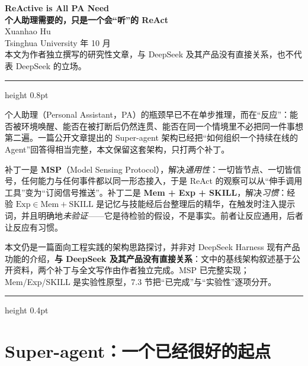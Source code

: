 \documentclass[11pt,a4paper,UTF8,fontset=windows]{ctexart}
\begin{document}
\thispagestyle{first}

\begin{center}
  {\LARGE\sffamily\bfseries ReActive is All PA Need}\\[0.5em]
  {\large\sffamily\bfseries 个人助理需要的，只是一个会“听”的 ReAct}\\[1.1em]
  {\normalsize Xuanhao Hu}\\[0.3em]
  {\footnotesize\color{dagray}Tsinghua University  年 10 月}\\[0.7em]
  {\footnotesize\color{dagray}本文为作者独立撰写的研究性文章，与 DeepSeek 及其产品没有直接关系，也不代表 DeepSeek 的立场。}
\end{center}
\vspace{0.6em}
{\color{dsblue}\hrule height 0.8pt}
\vspace{1.0em}

\noindent
{\small
\setlength{\parindent}{0pt}%
个人助理（Personal Assistant，PA）的瓶颈早已不在单步推理，而在“反应”：能否被环境唤醒、能否在被打断后仍然连贯、能否在同一个情境里不必把同一件事想第二遍。一篇公开文章提出的 Super-agent 架构已经把“如何组织一个持续在线的 Agent”回答得相当完整，本文保留这套架构，只打两个补丁。\par\vspace{0.45em}
补丁一是 \textbf{MSP}（Model Sensing Protocol），解决\emph{通用性}：一切皆节点、一切皆信号，任何能力与任何事件都以同一形态接入，于是 ReAct 的观察可以从“伸手调用工具”变为“订阅信号推送”。补丁二是 \textbf{Mem + Exp + SKILL}，解决\emph{习惯}：经验 $\mathrm{Exp}\in \mathrm{Mem}+\mathrm{SKILL}$ 是记忆与技能经后台整理后的精华，在触发时注入提示词，并且明确地\emph{未验证}——它是待检验的假设，不是事实。前者让反应通用，后者让反应有习惯。\par\vspace{0.45em}
本文仍是一篇面向工程实践的架构思路探讨，并非对 DeepSeek Harness 现有产品功能的介绍，\textbf{与 DeepSeek 及其产品没有直接关系}：文中的基线架构叙述基于公开资料，两个补丁与全文写作由作者独立完成。MSP 已完整实现；Mem/Exp/SKILL 是实验性原型，7.3 节把“已完成”与“实验性”逐项分开。
}
\vspace{0.9em}
{\color{dagray}\hrule height 0.4pt}
\vspace{1.4em}

\section{Super-agent：一个已经很好的起点}
\end{document}
